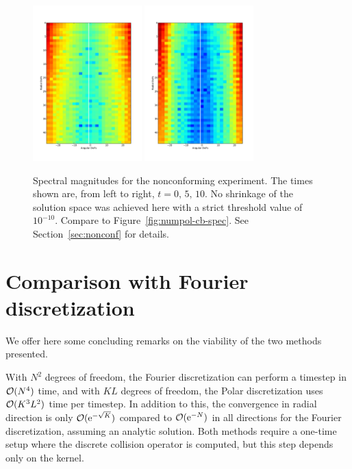\begin{figure}
{    \includegraphics[width=4.2cm]{figs/polboltz/comp2-spec-b2-i2}
    \includegraphics[width=4.2cm]{figs/polboltz/comp2-spec-b2-i3}
}
\caption{Spectral magnitudes for the nonconforming experiment.  The times shown are, from left to right,
$t=0,\,5,\,10$. No shrinkage of the solution space was achieved here with a strict threshold value of
$10^{-10}$. Compare to Figure~\ref{fig:numpol-cb-spec}. See Section~\vref{sec:nonconf} for details.}
\label{fig:numpol-nc-spec}
\end{figure}

\clearpage

\section{Comparison with Fourier discretization}
\label{sec:numerical-fou-pol}

We offer here some concluding remarks on the viability of the two methods presented.

With $N^2$ degrees of freedom, the Fourier discretization can perform a timestep in $\mathcal{O}(N^4)$ time, and with
$KL$ degrees of freedom, the Polar discretization uses $\mathcal{O}(K^3 L^2)$ time per timestep. In addition to this,
the convergence in radial direction is only $\mathcal{O}(\mathrm{e}^{-\sqrt{K}})$ compared to $\mathcal{O}(\mathrm{e}^{-N})$ in all
directions for the Fourier discretization, assuming an analytic solution. Both methods require a one-time
setup where the discrete collision operator is computed, but this step depends only on the kernel.

